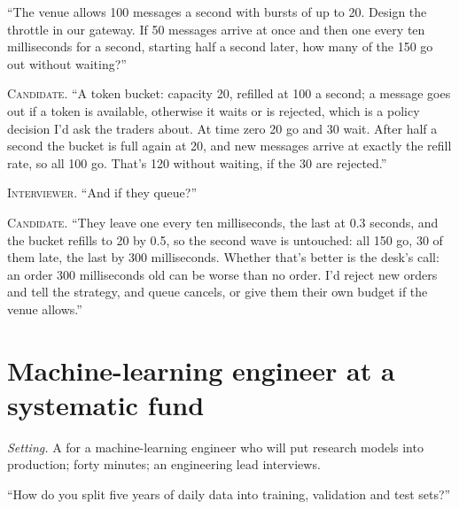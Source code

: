 
\begin{interviewq}\label{iq:iv:mock-interviews:9}
``The venue allows 100 messages a second with bursts of up to 20. Design the throttle in our gateway. If 50 messages arrive at once
and then one every ten milliseconds for a second, starting half a second later, how many of the 150 go out without waiting?''
\end{interviewq}

\noindent\textsc{Candidate.} ``A token bucket: capacity 20, refilled at 100 a second; a message goes out if a token is available,
otherwise it waits or is rejected, which is a policy decision I'd ask the traders about. At time zero 20 go and 30 wait. After half
a second the bucket is full again at 20, and new messages arrive at exactly the refill rate, so all 100 go. That's 120 without
waiting, if the 30 are rejected.''

\noindent\textsc{Interviewer.} ``And if they queue?''

\noindent\textsc{Candidate.} ``They leave one every ten milliseconds, the last at 0.3 seconds, and the bucket refills to 20 by 0.5, so
the second wave is untouched: all 150 go, 30 of them late, the last by 300 milliseconds. Whether that's better is the desk's call: an
order 300 milliseconds old can be worse than no order. I'd reject new orders and tell the strategy, and queue cancels, or give them
their own budget if the venue allows.''


\section{Machine-learning engineer at a systematic fund}

\emph{Setting.} A  for a machine-learning engineer who will put research models into production; forty
minutes; an engineering lead interviews.

\begin{interviewq}\label{iq:iv:mock-interviews:10}
``How do you split five years of daily data into training, validation and test sets?''
\end{interviewq}


